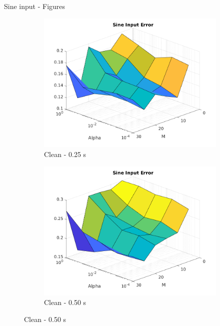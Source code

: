 \documentclass{beamer}
\begin{document}
\begin{frame}{Sine input - Figures}
    \begin{figure}
        \centering
        \begin{subfigure}[b]{0.3\textwidth}
            \centering
            \includegraphics[width=\textwidth]{Figures_Clean/figure_sine_T_0.25.png}
            \caption{Clean - 0.25 s}
            \label{fig:clean_sine_025}
        \end{subfigure}
        \hfill
        \begin{subfigure}[b]{0.3\textwidth}
            \centering
            \includegraphics[width=\textwidth]{Figures_Clean/figure_sine_T_0.50.png}
            \caption{Clean - 0.50 s}
            \label{fig:clean_sine_050}

\end{subfigure}
\end{figure}
\end{frame}
\end{document}

